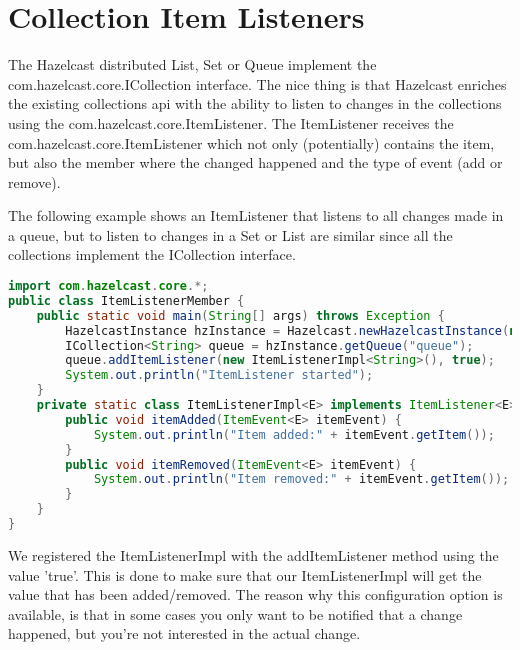 \section{Collection Item Listeners}
The Hazelcast distributed List, Set or Queue implement the com.hazelcast.core.ICollection interface. The nice thing is that Hazelcast enriches the existing collections api with the ability to listen to changes in the collections using the com.hazelcast.core.ItemListener. The ItemListener receives the com.hazelcast.core.ItemListener which not only (potentially) contains the item, but also the member where the changed happened and the type of event (add or remove).

The following example shows an ItemListener that listens to all changes made in a queue, but to listen to changes in a Set or List are similar since all the collections implement the ICollection interface.
\begin{lstlisting}[language=java]
import com.hazelcast.core.*;
public class ItemListenerMember {
    public static void main(String[] args) throws Exception {
        HazelcastInstance hzInstance = Hazelcast.newHazelcastInstance(null);
        ICollection<String> queue = hzInstance.getQueue("queue");
        queue.addItemListener(new ItemListenerImpl<String>(), true);
        System.out.println("ItemListener started");
    }
    private static class ItemListenerImpl<E> implements ItemListener<E> {
        public void itemAdded(ItemEvent<E> itemEvent) {
            System.out.println("Item added:" + itemEvent.getItem());
        }
        public void itemRemoved(ItemEvent<E> itemEvent) {
            System.out.println("Item removed:" + itemEvent.getItem());
        }
    }
}
\end{lstlisting}
We registered the ItemListenerImpl with the addItemListener method using the value 'true'. This is done to make sure that our ItemListenerImpl will get the value that has been added/removed. The reason why this configuration option is available, is that in some cases you only want to be notified that a change happened, but you're not interested in the actual change.

